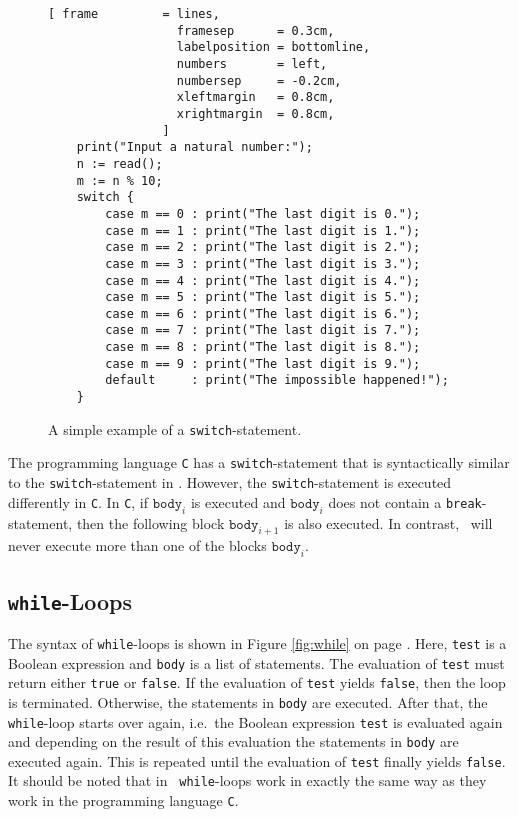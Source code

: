 \begin{figure}[!ht]
\centering
\begin{Verbatim}[ frame         = lines, 
                  framesep      = 0.3cm, 
                  labelposition = bottomline,
                  numbers       = left,
                  numbersep     = -0.2cm,
                  xleftmargin   = 0.8cm,
                  xrightmargin  = 0.8cm,
                ]
    print("Input a natural number:");
    n := read();
    m := n % 10;
    switch {
        case m == 0 : print("The last digit is 0.");
        case m == 1 : print("The last digit is 1.");
        case m == 2 : print("The last digit is 2.");
        case m == 3 : print("The last digit is 3.");
        case m == 4 : print("The last digit is 4.");
        case m == 5 : print("The last digit is 5.");
        case m == 6 : print("The last digit is 6.");
        case m == 7 : print("The last digit is 7.");
        case m == 8 : print("The last digit is 8.");
        case m == 9 : print("The last digit is 9.");
        default     : print("The impossible happened!");
    }
\end{Verbatim}
\vspace*{-0.3cm}
\caption{A simple example of a \texttt{switch}-statement.}
\label{fig:switch.stlx}
\end{figure}
\remarkEng
The programming language \texttt{C} has a \texttt{switch}-statement that is syntactically similar to the
\texttt{switch}-statement in \setlx.  However, the \texttt{switch}-statement is executed
\colorbox{amethyst}{differently} in \texttt{C}.  In \texttt{C}, if $\texttt{body}_i$ is executed and $\texttt{body}_i$ does not contain a
\texttt{break}-statement, then the following block $\texttt{body}_{i+1}$ is also executed.  In contrast,
\setlx\ will \colorbox{amethyst}{never} execute more than one of the blocks $\texttt{body}_i$.


\subsection{\texttt{while}-Loops}
The syntax of  \texttt{while}-loops is shown in Figure \ref{fig:while} on page
\pageref{fig:while}.  Here,  \texttt{test} is a Boolean expression and \texttt{body} is a list of statements.  
The evaluation of \texttt{test} must
return either  \texttt{true} or \texttt{false}.
If the evaluation of \texttt{test} yields  \texttt{false}, then the loop is terminated.
Otherwise, the statements in \texttt{body} are executed.  After that, the \texttt{while}-loop starts over
again, i.e.~the Boolean expression \texttt{test} is evaluated again and depending on the result of this evaluation
the statements in  \texttt{body} are executed again.  This is repeated until the evaluation of  \texttt{test}
finally yields  \texttt{false}.  It should be noted that in \setlx\ \texttt{while}-loops work in exactly
the same way as they work in the programming language \texttt{C}.

